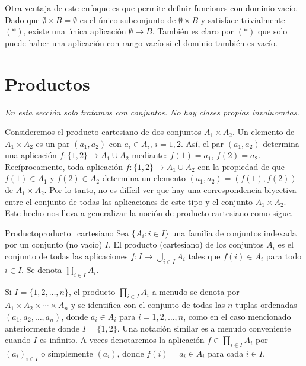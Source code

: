 Otra ventaja de este enfoque es que permite definir funciones con dominio vacío. Dado que \( \emptyset \times B = \emptyset \) es el único subconjunto de \( \emptyset \times B \) y satisface trivialmente $(*)$, existe una única aplicación \( \emptyset \to B \). También es claro por $(*)$ que solo puede haber una aplicación con rango vacío si el dominio también es vacío.

\clearpage
\section{Productos}

\textit{En esta sección solo tratamos con conjuntos. No hay clases propias involucradas.}
\vspace{0.5cm}

Consideremos el producto cartesiano de dos conjuntos \( A_1 \times A_2 \). Un elemento de \( A_1 \times A_2 \) es un par \( (a_1, a_2) \) con \( a_i \in A_i \), \( i = 1, 2 \). Así, el par \( (a_1, a_2) \) determina una aplicación \( f: \{1, 2\} \to A_1 \cup A_2 \) mediante: \( f(1) = a_1 \), \( f(2) = a_2 \). Recíprocamente, toda aplicación \( f: \{1, 2\} \to A_1 \cup A_2 \) con la propiedad de que \( f(1) \in A_1 \) y \( f(2) \in A_2 \) determina un elemento \( (a_1, a_2) = (f(1), f(2)) \) de \( A_1 \times A_2 \). Por lo tanto, no es difícil ver que hay una correspondencia biyectiva entre el conjunto de todas las aplicaciones de este tipo y el conjunto \( A_1 \times A_2 \). Este hecho nos lleva a generalizar la noción de producto cartesiano como sigue.

\begin{definition}{Producto}{producto_cartesiano}
    Sea \( \{A_i : i \in I\} \) una familia de conjuntos indexada por un conjunto (no vacío) \( I \). El producto (cartesiano) de los conjuntos \( A_i \) es el conjunto de todas las aplicaciones \( f: I \to \bigcup_{i \in I} A_i \) tales que \( f(i) \in A_i \) para todo \( i \in I \). Se denota \( \prod_{i \in I} A_i \).
\end{definition}

Si \( I = \{1, 2, \ldots, n\} \), el producto \( \prod_{i \in I} A_i \) a menudo se denota por \( A_1 \times A_2 \times \cdots \times A_n \) y se identifica con el conjunto de todas las \( n \)-tuplas ordenadas \( (a_1, a_2, \ldots, a_n) \), donde \( a_i \in A_i \) para $i = 1, 2, \ldots, n$, como en el caso mencionado anteriormente donde $I = \{1, 2\}$. Una notación similar es a menudo conveniente cuando $I$ es infinito. A veces denotaremos la aplicación $f \in \prod_{i \in I} A_i$ por $(a_i)_{i \in I}$ o simplemente $(a_i)$, donde $f(i) = a_i \in A_i$ para cada $i \in I$.

